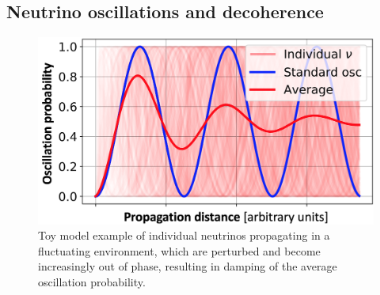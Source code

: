 \documentclass[a4paper,11pt]{article}
\begin{document}

\subsection{Neutrino oscillations and decoherence}

\begin{figure} %
    \centering
		\vspace{-7pt}
		\includegraphics[width=1.\linewidth]{images/decoherence.png}
		\caption{Toy model example of individual neutrinos propagating in a fluctuating environment, which are perturbed and become increasingly out of phase, resulting in damping of the average oscillation probability.}
		\vspace{-5pt}
		\label{fig:decoherence}
\end{figure}
\end{document}
